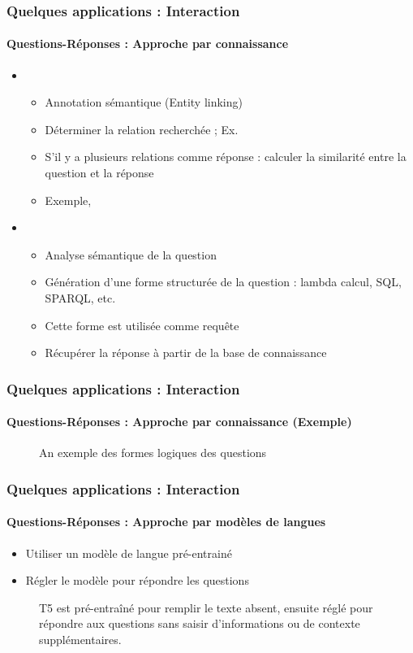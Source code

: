 \documentclass[xcolor=table]{beamer}
\begin{document}
\begin{frame}
	\frametitle{Quelques applications : Interaction}
	\framesubtitle{Questions-Réponses : Approche par connaissance}
	
	\begin{itemize}
		\item {}
		\begin{itemize}
			\item Annotation sémantique (Entity linking)
			\item Déterminer la relation recherchée ; Ex. 
			\item S'il y a plusieurs relations comme réponse : calculer la similarité entre la question et la réponse
			\item Exemple, 
		\end{itemize}
		\item {}
		\begin{itemize}
			\item Analyse sémantique de la question
			\item Génération d'une forme structurée de la question : lambda calcul, SQL, SPARQL, etc.
			\item Cette forme est utilisée comme requête
			\item Récupérer la réponse à partir de la base de connaissance
		\end{itemize}
	\end{itemize}
	
\end{frame}

\begin{frame}
	\frametitle{Quelques applications : Interaction}
	\framesubtitle{Questions-Réponses : Approche par connaissance (Exemple)}
	
	\begin{figure}
		\centering
		\caption{An exemple des formes logiques des questions \cite{2020-jurafsky-martin}}
	\end{figure}
	
\end{frame}

\begin{frame}
	\frametitle{Quelques applications : Interaction}
	\framesubtitle{Questions-Réponses : Approche par modèles de langues}
	
	\begin{itemize}
		\item Utiliser un modèle de langue pré-entrainé
		\item Régler le modèle pour répondre les questions
	\end{itemize}

	\begin{figure}
		\centering
		\caption{T5 est pré-entraîné pour remplir le texte absent, ensuite réglé pour répondre aux questions sans saisir d'informations ou de contexte supplémentaires. \cite{2020-roberts-al}}
	\end{figure}
	
\end{frame}
\end{document}
